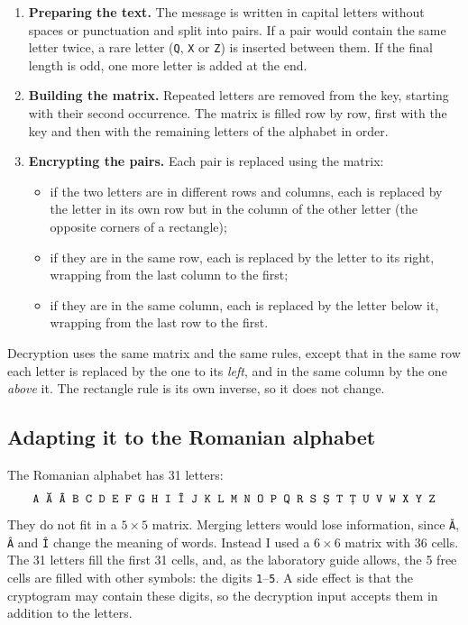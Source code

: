 \documentclass[12pt,a4paper]{article}
\begin{document}
\begin{enumerate}[label=\alph*)]
  \item \textbf{Preparing the text.} The message is written in capital letters without spaces or punctuation and split into pairs. If a pair would contain the same letter twice, a rare letter (\texttt{Q}, \texttt{X} or \texttt{Z}) is inserted between them. If the final length is odd, one more letter is added at the end.
  \item \textbf{Building the matrix.} Repeated letters are removed from the key, starting with their second occurrence. The matrix is filled row by row, first with the key and then with the remaining letters of the alphabet in order.
  \item \textbf{Encrypting the pairs.} Each pair is replaced using the matrix:
  \begin{itemize}
    \item if the two letters are in different rows and columns, each is replaced by the letter in its own row but in the column of the other letter (the opposite corners of a rectangle);
    \item if they are in the same row, each is replaced by the letter to its right, wrapping from the last column to the first;
    \item if they are in the same column, each is replaced by the letter below it, wrapping from the last row to the first.
  \end{itemize}
\end{enumerate}

Decryption uses the same matrix and the same rules, except that in the same row each letter is replaced by the one to its \emph{left}, and in the same column by the one \emph{above} it. The rectangle rule is its own inverse, so it does not change.

\subsection{Adapting it to the Romanian alphabet}

The Romanian alphabet has 31 letters:
\[
\texttt{A \u{A} \^A B C D E F G H I \^I J K L M N O P Q R S \textcommabelow{S} T \textcommabelow{T} U V W X Y Z}
\]
They do not fit in a $5 \times 5$ matrix. Merging letters would lose information, since \texttt{\u{A}}, \texttt{\^A} and \texttt{\^I} change the meaning of words. Instead I used a $6 \times 6$ matrix with 36 cells. The 31 letters fill the first 31 cells, and, as the laboratory guide allows, the 5 free cells are filled with other symbols: the digits \texttt{1}--\texttt{5}. A side effect is that the cryptogram may contain these digits, so the decryption input accepts them in addition to the letters.
\end{document}
